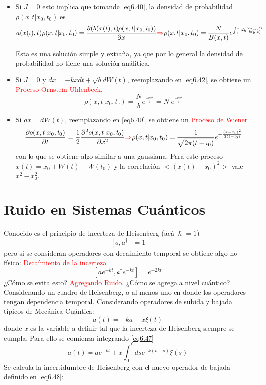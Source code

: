 \documentclass{book}
\begin{document}
\begin{itemize}
    \item Si $J=0$ esto implica que tomando \ref{eq6.40}, la densidad de probabilidad $\rho(x,t|x_0,t_0)$ es
\begin{equation}\label{eq6.42}a(x(t),t)\rho(x,t|x_0,t_0)=\frac{\partial(b(x(t),t)\rho(x,t|x_0,t_0))}{\partial x}\textcolor{red}{\Rightarrow}\rho(x,t|x_0,t_0)=\frac{N}{B(x,t)}e^{\int_0^x dy \frac{2a(y,t)}{b(y,t)}}\end{equation}

Esta es una solución simple y extraña, ya que por lo general la densidad de probabilidad no tiene una solución análitica.
    \item Si $J=0$ y $dx=-kx dt +\sqrt{b} dW(t)$, reemplazando en \ref{eq6.42}, se obtiene un \textcolor{red}{Proceso Ornstein-Uhlenbeck}.
    \begin{equation}\label{eq6.43}\rho(x,t|x_0,t_0)=\frac{N}{b}e^{\frac{-kx^2}{b}}=N^\prime e^{\frac{-kx^2}{b}}\end{equation}
    \item Si $dx=dW(t)$, reemplazando en \ref{eq6.40}, se obtiene un \textcolor{red}{Proceso de Wiener}
    \begin{equation}\label{eq6.44}\frac{\partial\rho(x,t|x_0,t_0)}{\partial t}=\frac{1}{2}\frac{\partial^2\rho(x,t|x_0,t_0)}{\partial x^2}\textcolor{red}{\Rightarrow} \rho(x,t|x_0,t_0)=\frac{1}{\sqrt{2\pi(t-t_0)}}e^{-\frac{(x-x_0)^2}{2(t-t_0)}}\end{equation}
    con lo que se obtiene algo similar a una gaussiana. Para este proceso $x(t)=x_0+W(t)-W(t_0)$ y la correlación $<(x(t)-x_0)^2>$ vale $x^2-x_0^2$.
\end{itemize}
\section{Ruido en Sistemas Cuánticos}

Conocido es el principio de Incerteza de Heisenberg (acá $\hslash=1$)
\begin{equation}\label{eq6.45}[a,a^\dag]=1\end{equation}  pero si se consideran operadores con decaimiento temporal se obtiene algo no físico: \textcolor{red}{Decaímiento de la incerteza}
\begin{equation}\label{eq6.46} [ae^{-k t}, a^\dag e^{-k t}]=e^{-2k t}\end{equation}
¿Cómo se evita esto? \textcolor{red}{Agregando Ruido}. ¿Cómo se agrega a nivel cuántico? Considerando un cuadro de Heisenberg, o al menos uno en donde los operadores tengan dependencia temporal. Considerando operadores de subida y bajada típicos de Mecánica Cuántica:
 \begin{equation} \label{eq6.47}\dot{a}(t)=-ka+x\xi(t)\end{equation}
donde $x$ es la variable a definir tal que la incerteza de Heisenberg siempre se cumpla. Para ello se comienza integrando \ref{eq6.47} 
\begin{equation}\label{eq6.48} a(t)=ae^{-kt} +x \int_0^t ds e^{-k(t-s)}\xi(s)\end{equation}
Se calcula la incertidumbre de Heisenberg con el nuevo operador de bajada definido en \ref{eq6.48}:
\end{document}
